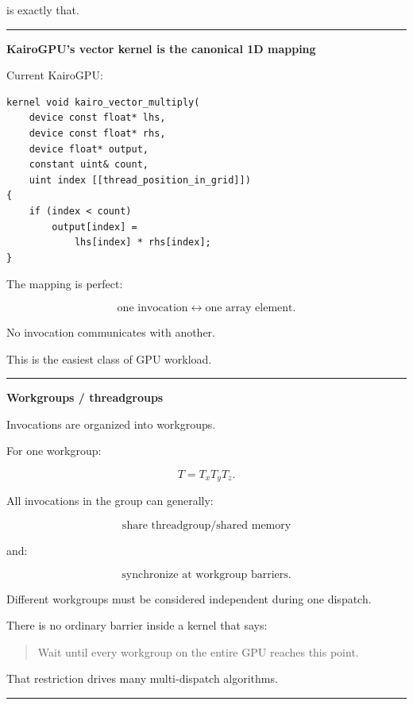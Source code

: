 is exactly that.

\begin{center}\rule{0.5\linewidth}{0.5pt}\end{center}

\textbf{KairoGPU's vector kernel is the canonical 1D mapping}

Current KairoGPU:

\protect{}\label{v6nvzv}%
\begin{verbatim}
kernel void kairo_vector_multiply(
    device const float* lhs,
    device const float* rhs,
    device float* output,
    constant uint& count,
    uint index [[thread_position_in_grid]])
{
    if (index < count)
        output[index] =
            lhs[index] * rhs[index];
}
\end{verbatim}

The mapping is perfect:

\[
\boxed{
\text{one invocation}
\leftrightarrow
\text{one array element}.
}
\]

No invocation communicates with another.

This is the easiest class of GPU workload.

\begin{center}\rule{0.5\linewidth}{0.5pt}\end{center}

\textbf{Workgroups / threadgroups}

Invocations are organized into workgroups.

For one workgroup:

\[
T=
T_xT_yT_z.
\]

All invocations in the group can generally:

\[
\text{share threadgroup/shared memory}
\]

and:

\[
\text{synchronize at workgroup barriers}.
\]

Different workgroups must be considered independent during one dispatch.

There is no ordinary barrier inside a kernel that says:

\begin{quote}
Wait until every workgroup on the entire GPU reaches this point.
\end{quote}

That restriction drives many multi-dispatch algorithms.

\begin{center}\rule{0.5\linewidth}{0.5pt}\end{center}

